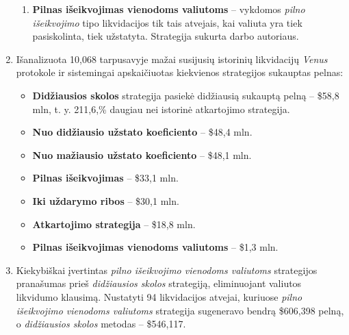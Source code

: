 \documentclass[]{VUMIFTemplateClass}
\begin{document}
\begin{enumerate}
\begin{enumerate}
  \item \textbf{Pilnas išeikvojimas vienodoms valiutoms} – vykdomos \textit{pilno išeikvojimo} tipo likvidacijos tik tais atvejais, kai valiuta yra tiek pasiskolinta, tiek užstatyta. Strategija sukurta darbo autoriaus.
  \end{enumerate}
\item Išanalizuota 10,068 tarpusavyje mažai susijusių istorinių likvidacijų \textit{Venus} protokole ir sistemingai apskaičiuotas kiekvienos strategijos sukauptas pelnas:
\begin{itemize}
\item \textbf{Didžiausios skolos} strategija pasiekė didžiausią sukauptą pelną – \$58,8 mln, t. y. 211,6,\% daugiau nei istorinė atkartojimo strategija.
\item \textbf{Nuo didžiausio užstato koeficiento} – \$48,4 mln.
\item \textbf{Nuo mažiausio užstato koeficiento} – \$48,1 mln.
\item \textbf{Pilnas išeikvojimas} – \$33,1 mln.
\item \textbf{Iki uždarymo ribos} – \$30,1 mln.
\item \textbf{Atkartojimo strategija} – \$18,8 mln.
\item \textbf{Pilnas išeikvojimas vienodoms valiutoms} – \$1,3 mln.
\end{itemize}

\item Kiekybiškai įvertintas \textit{pilno išeikvojimo vienodoms valiutoms} strategijos pranašumas prieš \textit{didžiausios skolos} strategiją, eliminuojant valiutos likvidumo klausimą. Nustatyti 94 likvidacijos atvejai, kuriuose \textit{pilno išeikvojimo vienodoms valiutoms} strategija sugeneravo bendrą \$606,398 pelną, o \textit{didžiausios skolos} metodas – \$546,117.
\end{enumerate}
\end{document}
